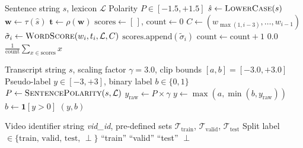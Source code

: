 \documentclass[12pt,a4paper]{article}
\theoremstyle{plain}
\theoremstyle{definition}
\begin{document}
\begin{algorithm}[H]
\caption{TextBlob Sentence Polarity}
\label{alg:sentence_polarity}
\begin{algorithmic}[1]
\Require Sentence string $s$, lexicon $\mathcal{L}$
\Ensure  Polarity $P \in [-1.5, +1.5]$
\State $\hat{s} \gets \textsc{LowerCase}(s)$
\State $\mathbf{w} \gets \tau(\hat{s})$
\State $\mathbf{t} \gets \rho(\mathbf{w})$
\State $\text{scores} \gets [\,]$, $\text{count} \gets 0$
  \State $C \gets (w_{\max(1,i-3)}, \ldots, w_{i-1})$
  \State $\tilde{\sigma}_i \gets \textsc{WordScore}(w_i, t_i, \mathcal{L}, C)$
    \State $\text{scores.append}(\tilde{\sigma}_i)$
    \State $\text{count} \gets \text{count} + 1$
  \EndIf
\EndFor
{}
  \State \Return $0.0$
\Else
  \State \Return $\frac{1}{\text{count}}\sum_{x \in \text{scores}} x$
\EndIf
\end{algorithmic}
\end{algorithm}

\begin{algorithm}[H]
\caption{Compute Pseudo-Label $y$ from Transcript Text}
\label{alg:pseudo_label}
\begin{algorithmic}[1]
\Require Transcript string $s$, scaling factor $\gamma = 3.0$,
         clip bounds $[a, b] = [-3.0, +3.0]$
\Ensure  Pseudo-label $y \in [-3, +3]$, binary label $b \in \{0,1\}$
\State $P \gets \textsc{SentencePolarity}(s, \mathcal{L})$
\State $y_{\text{raw}} \gets P \times \gamma$
\State $y \gets \max(a, \min(b, y_{\text{raw}}))$
\State $b \gets \mathbf{1}[y > 0]$
\State \Return $(y, b)$
\end{algorithmic}
\end{algorithm}

\begin{algorithm}[H]
\caption{\texttt{get\_split(vid\_id)} — Split Lookup}
\label{alg:get_split}
\begin{algorithmic}[1]
\Require Video identifier string \textit{vid\_id},
         pre-defined sets $\mathcal{T}_\text{train}$,
         $\mathcal{T}_\text{valid}$, $\mathcal{T}_\text{test}$
\Ensure  Split label $\in \{\text{train, valid, test, }\perp\}$
  \State \Return ``train''
  \State \Return ``valid''
  \State \Return ``test''
\Else
  \State \Return $\perp$ 
\EndIf
\end{algorithmic}
\end{algorithm}
\end{document}
